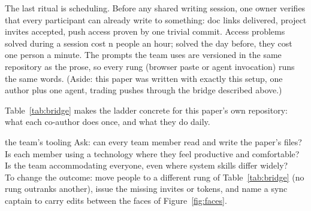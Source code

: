 The last ritual is scheduling.
Before any shared writing session, one owner verifies that every
participant can already write to something: doc links delivered,
project invites accepted, push access proven by one trivial commit.
Access problems solved during a session cost n people an hour; solved
the day before, they cost one person a minute.
The prompts the team uses are versioned in the same repository as the
prose, so every rung (browser paste or agent invocation) runs the same
words.
(Aside: this paper was written with exactly this setup, one author
plus one agent, trading pushes through the bridge described above.)



Table~\ref{tab:bridge} makes the ladder concrete for this
paper's own repository: what each co-author does once, and
what they do daily.



\begin{pause}{the team's tooling}
Ask: can every team member read and write the paper's files?
Is each member using a technology where they feel productive
and comfortable?
Is the team accommodating everyone, even where system skills
differ widely?\\[0.2em]
To change the outcome: move people to a different rung of
Table~\ref{tab:bridge} (no rung outranks another), issue the
missing invites or tokens, and name a sync captain to carry
edits between the faces of Figure~\ref{fig:faces}.
\end{pause}
